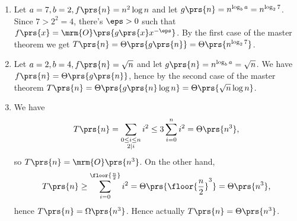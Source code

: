 \documentclass[oneside]{scrbook}
\theoremstyle{definition}
\begin{document}
\begin{problem}
\begin{enumerate}[label=\alph*.]
\item %
Let $a = 7, b = 2, f\prs{n} = n^2 \log n$ and let $g\prs{n} = n^{\log_b a} = n^{\log_2 7}$. Since $7 > 2^2 = 4$, there's $\eps > 0$ such that $f\prs{x} = \mrm{O}\prs{g\prs{x} x^{-\eps}}$. By the first case of the master theorem we get $T\prs{n} = \Theta\prs{g\prs{n}} = \Theta\prs{n^{\log_2 7}}$.

\item %
Let $a = 2, b = 4, f\prs{n} = \sqrt{n}$ and let $g\prs{n} = n^{\log_b a} = \sqrt{n}$. We have $f\prs{n} = \Theta\prs{g\prs{n}}$, hence by the second case of the master theorem $T\prs{n} = \Theta\prs{g\prs{n} \log n} = \Theta\prs{\sqrt{n} \log n}$.

\item %
We have
\begin{align*}
T\prs{n} = \sum_{\substack{0 \leq i \leq n \\ 2 \mid i}} i^2 \leq 3 \sum_{i=0}^{n} i^2 = \Theta\prs{n^3} \text{,}
\end{align*}
so
$T\prs{n} = \mrm{O}\prs{n^3}$.
On the other hand,
\begin{align*}
T\prs{n} \geq \sum_{i = 0}^{\floor{\frac{n}{2}}} i^2 = \Theta\prs{\floor{\frac{n}{2}}^3} = \Theta\prs{n^3} \text{,}
\end{align*}
hence $T\prs{n} = \Omega\prs{n^3}$. Hence actually $T\prs{n} = \Theta\prs{n^3}$.

\end{enumerate}
\end{problem}
\end{document}
